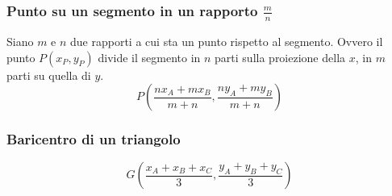 \subsubsection{Punto su un segmento in un rapporto $\frac{m}{n}$}
Siano $m$ e $n$ due rapporti a cui sta un punto rispetto al segmento. Ovvero il punto $P(x_P, y_P)$
divide il segmento in $n$ parti sulla proiezione della $x$, in $m$ parti su quella di $y$.
\begin{equation*}
  P\left(\frac{nx_A+mx_B}{m+n},\frac{ny_A+my_B}{m+n}\right)
\end{equation*}

\subsubsection{Baricentro di un triangolo}
\begin{equation*}
  G\left(\frac{x_A+x_B+x_C}{3},\frac{y_A+y_B+y_C}{3}\right)
\end{equation*}

